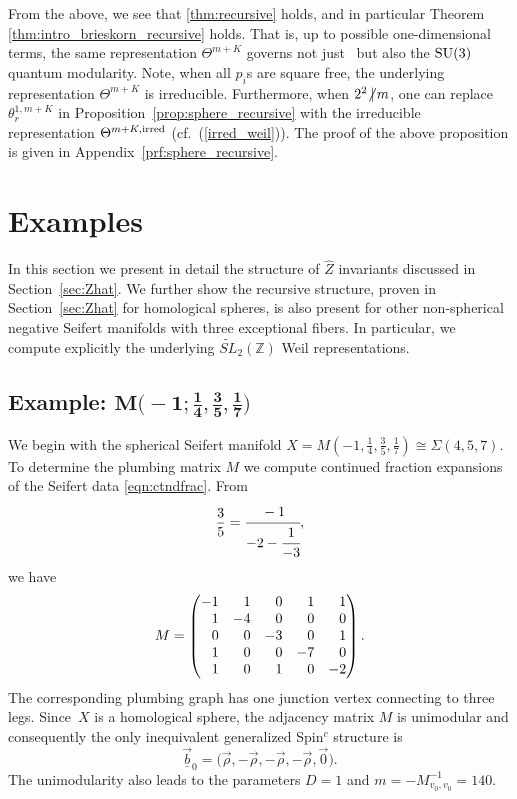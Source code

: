 \documentclass[pdftex]{sigma}
\def\BZ{\mathbb{Z}}
\def\wv{\vec{\rho}}
\newcommand{\ZZ}{\mathbb{Z}}
\theoremstyle{definition}
\numberwithin{equation}{section}
\begin{document}
From the above, we see that \eqref{thm:recursive} holds, and in particular Theorem \ref{thm:intro_brieskorn_recursive} holds. That is, up to possible one-dimensional terms, the same \smash{$\widetilde{{\rm SL}_2(\BZ)}$} representation $\Theta^{m+K}$ governs not just~ but also the ${\rm SU}(3)$ quantum modularity. Note, when all $p_i$s are square free, the underlying representation $\Theta^{m+K}$ is irreducible. Furthermore, when $2^2{\not\hspace{2.5pt}\mid}\, m$, one can replace $\theta^{1,m+K}_r$ in Proposition~\ref{prop:sphere_recursive} with the irreducible representation $\Theta^{m+K,{\rm irred}}$ (cf.\ (\ref{irred_weil})). The proof of the above proposition is given in Appendix~\ref{prf:sphere_recursive}.

\section{Examples}\label{sec:examples}
In this section we present in detail the structure of $\widehat{Z}$ invariants discussed in Section~\ref{sec:Zhat}. We further show the recursive structure, proven in Section~\ref{sec:Zhat} for homological spheres, is also present for other non-spherical negative Seifert manifolds with three exceptional fibers. In particular, we compute explicitly the underlying $\widetilde{SL}_2(\ZZ)$ Weil representations.

\subsection[Example: M(-1;1/4,3/5,1/7)]{Example: $\boldsymbol{ M\bigl(-1;\frac{1}{4},\frac{3}{5},\frac{1}{7}\bigr)}$}

We begin with the spherical Seifert manifold $X = M\left( -1,\frac{1}{4},\frac{3}{5},\frac{1}{7} \right)\cong\Sigma(4,5,7)$. To determine the plumbing matrix $M$ we compute continued fraction expansions of the Seifert data \eqref{eqn:ctndfrac}. From
\[
 \frac{3}{5}=\cfrac{-1}{-2-\cfrac{1}{-3}},
\]
we have
\begin{equation*}
 M=\left(
\begin{matrix}
 -1 & \hphantom{-}1 & \hphantom{-}0 & \hphantom{-}1 & \hphantom{-}1 \\
 \hphantom{-}1 & -4 & \hphantom{-}0 & \hphantom{-}0 & \hphantom{-}0 \\
 \hphantom{-}0 & \hphantom{-}0 & -3 & \hphantom{-}0 & \hphantom{-}1 \\
 \hphantom{-}1 & \hphantom{-}0 & \hphantom{-}0 & -7 & \hphantom{-}0 \\
 \hphantom{-}1 & \hphantom{-}0 & \hphantom{-}1 & \hphantom{-}0 & -2 \\
\end{matrix}
\right).
\end{equation*}
The corresponding plumbing graph has one junction vertex connecting to three legs. Since~$X$ is a homological sphere, the adjacency matrix $M$ is unimodular and consequently the only inequivalent generalized Spin$^c$ structure is
\[
\vec{\underline{b}}_{0}=\bigl( \wv,-\wv,-\wv,-\wv,\vec 0 \bigr).
\]
The unimodularity also leads to the parameters $D=1$ and $m=-M_{v_{0},v_{0}}^{-1}=140$.
\end{document}
